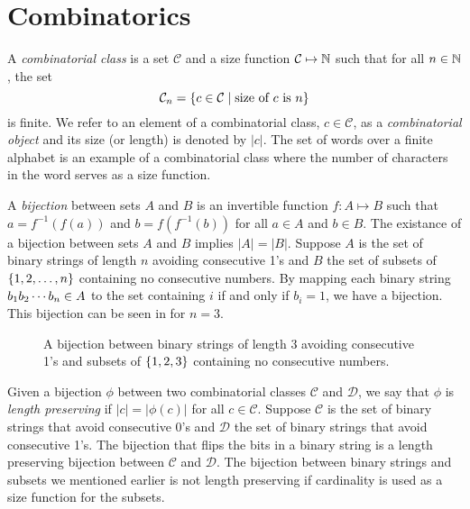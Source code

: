 \label{ch:backgr}
\section{Combinatorics\label{sec:combinatorics}}
A \emph{combinatorial class} is a set $\mathcal{C}$ and a size function $\mathcal{C} \mapsto \mathbb{N}$ such that for all $n\in\mathbb{N}$, the set
\[
    \mathcal{C}_n = \left\{c \in \mathcal{C} \mid \text{size of $c$ is $n$}\right\}
\]
is finite. We refer to an element of a combinatorial class, $c\in\mathcal{C}$, as a \emph{combinatorial object} and its size (or length) is denoted by $|c|$. The set of words over a finite alphabet is an example of a combinatorial class where the number of characters in the word serves as a size function.

A \emph{bijection} between sets $A$ and $B$ is an invertible function $f: A \mapsto B$ such that $a=f^{-1}(f(a))$ and $b=f(f^{-1}(b))$ for all $a\in A$ and $b \in B$. The existance of a bijection between sets $A$ and $B$ implies $|A|=|B|$. Suppose $A$ is the set of binary strings of length $n$ avoiding consecutive 1's and $B$ the set of subsets of $\left\{1,2,\dotsc,n\right\}$ containing no consecutive numbers. By mapping each binary string $b_1 b_2 \dotsm b_{n} \in A$ to the set containing $i$ if and only if $b_i=1$, we have a bijection. This bijection can be seen in  for $n=3$.

\begin{figure}[ht!]
    \centering
    
    \caption{A bijection between binary strings of length 3 avoiding consecutive 1's and subsets of $\left\{1,2,3\right\}$ containing no consecutive numbers.}
    \label{fig:bijection_example}
\end{figure}

Given a bijection $\phi$ between two combinatorial classes $\mathcal{C}$ and $\mathcal{D}$, we say that $\phi$ is \emph{length preserving} if $|c| = |\phi(c)|$ for all $c\in\mathcal{C}$. Suppose $\mathcal{C}$ is the set of binary strings that avoid consecutive 0's and $\mathcal{D}$ the set of binary strings that avoid consecutive 1's. The bijection that flips the bits in a binary string is a length preserving bijection between $\mathcal{C}$ and $\mathcal{D}$. The bijection between binary strings and subsets we mentioned earlier is not length preserving if cardinality is used as a size function for the subsets.

